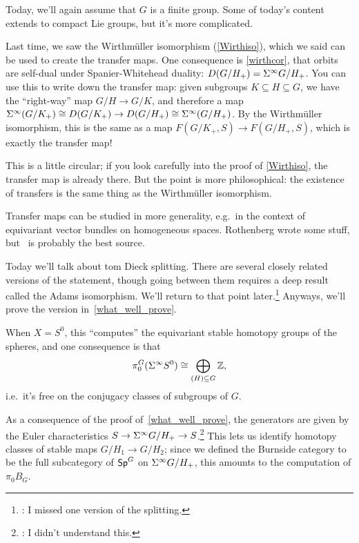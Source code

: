 Today, we'll again assume that $G$ is a finite group. Some of today's content extends to compact Lie groups, but
it's more complicated.

Last time, we saw the Wirthmüller isomorphism (\cref{Wirthiso}), which we said can be used to create the
transfer maps. One consequence is \cref{wirthcor}, that orbits are self-dual under Spanier-Whitehead duality:
$D(G/H_+) = \Sigma^\infty G/H_+$. You can use this to write down the transfer map: given subgroups $K\subseteq
H\subseteq G$, we have the ``right-way'' map $G/H\to G/K$, and therefore a map $\Sigma^\infty(G/K_+)\cong
D(G/K_+)\to D(G/H_+)\cong\Sigma^\infty(G/H_+)$. By the Wirthmüller isomorphism, this is the same as a map
$F(G/K_+,S)\to F(G/H_+,S)$, which is exactly the transfer map!

This is a little circular; if you look carefully into the proof of \cref{Wirthiso}, the transfer map is already
there. But the point is more philosophical: the existence of transfers is the same thing as the Wirthmüller
isomorphism.
\begin{rem}
Transfer maps can be studied in more generality, e.g.\ in the context of equivariant vector bundles on homogeneous
spaces. Rothenberg wrote some stuff, but~\cite{LMS} is probably the best source.
\end{rem}
Today we'll talk about tom Dieck splitting. There are several closely related versions of the statement, though
going between them requires a deep result called the Adams isomorphism. We'll return to that point
later.\footnote{\TODO: I missed one version of the splitting.}
Anyways, we'll prove the version in~\eqref{what_well_prove}.

When $X = S^0$, this ``computes'' the equivariant stable homotopy groups of the spheres, and one consequence is
that
\begin{equation}
\label{piGs0}
\pi^G_0(\Sigma^\infty S^0) \cong \bigoplus_{(H)\subseteq G} \mathbb Z,
\end{equation}
i.e.\ it's free on the conjugacy classes of subgroups of $G$.

As a consequence of the proof of~\eqref{what_well_prove}, the generators are given by the Euler characteristics
$S\to \Sigma^\infty G/H_+\to S$.\footnote{\TODO: I didn't understand this.} This lets us identify homotopy classes
of stable maps $G/H_1\to G/H_2$; since we defined the Burnside category to be the full subcategory of $\mathsf{Sp}^G$ on
$\Sigma^\infty G/H_+$, this amounts to the computation of $\pi_0 B_G$.

